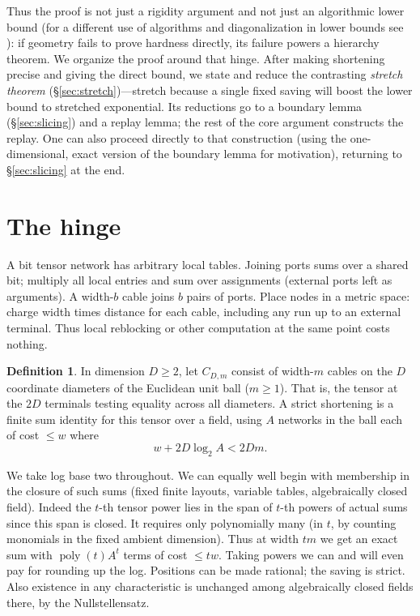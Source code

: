 \documentclass[11pt,letterpaper]{article}
\theoremstyle{definition}
\newtheorem{definition}[theorem]{Definition}
\numberwithin{equation}{section}
\DeclareMathOperator{\poly}{poly}
\begin{document}
Thus the proof is not just a rigidity argument and not just an algorithmic lower bound
(for a different use of algorithms and diagonalization in lower bounds see \cite{Williams13}): if geometry
fails to prove hardness directly, its failure powers a hierarchy theorem. We organize the
proof around that hinge. After making shortening precise and giving the direct bound,
we state and reduce the contrasting \emph{stretch theorem} (\S\ref{sec:stretch})---stretch because a single fixed
saving will boost the lower bound to stretched exponential. Its reductions go to a boundary
lemma (\S\ref{sec:slicing}) and a replay lemma; the rest of the core argument constructs the replay. One
can also proceed directly to that construction (using the one-dimensional, exact version of
the boundary lemma for motivation), returning to \S\ref{sec:slicing} at the end.

\section{The hinge}\label{sec:hinge}

A bit tensor network has arbitrary local tables. Joining ports sums over a shared bit; multiply
all local entries and sum over assignments (external ports left as arguments). A width-$b$
cable joins $b$ pairs of ports. Place nodes in a metric space: charge width times distance for
each cable, including any run up to an external terminal. Thus local reblocking or other
computation at the same point costs nothing.

\begin{definition}\label{thm:shortening}
In dimension $D\ge 2$, let $C_{D,m}$ consist of width-$m$ cables on the $D$ coordinate
diameters of the Euclidean unit ball ($m\ge 1$). That is, the tensor at the $2D$ terminals testing
equality across all diameters. A strict shortening is a finite sum identity for this tensor over
a field, using $A$ networks in the ball each of cost $\le w$ where
\[
  w + 2D\log_2 A < 2Dm.
\]
\end{definition}

We take log base two throughout. We can equally well begin with membership in
the closure of such sums (fixed finite layouts, variable tables, algebraically closed field).
Indeed the $t$-th tensor power lies in the span of $t$-th powers of actual sums since this span
is closed. It requires only polynomially many (in $t$, by counting monomials in the fixed
ambient dimension). Thus at width $tm$ we get an exact sum with $\poly(t)A^t$ terms of cost
$\le tw$. Taking powers we can and will even pay for rounding up the log. Positions can be
made rational; the saving is strict. Also existence in any characteristic is unchanged among
algebraically closed fields there, by the Nullstellensatz.
\end{document}
